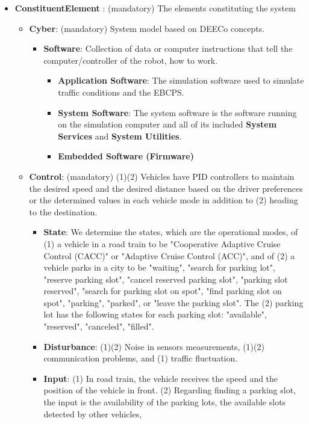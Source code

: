 \begin{itemize}
    \item \checkmark \textbf{ConstituentElement} : (mandatory) The elements constituting the system
    \begin{itemize}
        \item \checkmark \textbf{Cyber}: (mandatory) System model based on DEECo concepts.
        \begin{itemize}
            \item \checkmark \textbf{Software}: Collection of data or computer instructions that tell the computer/controller of the robot, how to work. 
            \begin{itemize}
                \item \checkmark \textbf{Application Software}: The simulation software used to simulate traffic conditions and the EBCPS.
                \item \checkmark \textbf{System Software}: The system software is the software running on the simulation computer and all of its included \textbf{System Services} and \textbf{System Utilities}.
                \item \xmark \textbf{Embedded Software (Firmware)} 
            \end{itemize}
        \end{itemize}
        \item \checkmark \textbf{Control}: (mandatory) (1)(2) Vehicles have PID controllers to maintain the desired speed and the desired distance based on the driver preferences or the determined values in each vehicle mode in addition to (2) heading to the destination. 
        \begin{itemize}
            \item \checkmark \textbf{State}: We determine the states, which are the operational modes, of (1) a vehicle in a road train to be "Cooperative Adaptive Cruise Control (CACC)" or "Adaptive Cruise Control (ACC)", and of (2) a vehicle parks in a city to be "waiting", "search for parking lot", "reserve parking slot", "cancel reserved parking slot", "parking slot reserved", "search for parking slot on spot", "find parking slot on spot", "parking", "parked", or "leave the parking slot". The (2) parking lot has the following states for each parking slot: "available", "reserved", "canceled", "filled".  
            \item \checkmark \textbf{Disturbance}: (1)(2) Noise in sensors measurements, (1)(2) communication problems, and (1) traffic fluctuation.
            \item \checkmark \textbf{Input}: (1) In road train, the vehicle receives the speed and the position of the vehicle in front. (2) Regarding finding a parking slot, the input is the availability of the parking lots, the available slots detected by other vehicles, 

\end{itemize}
\end{itemize}
\end{itemize}
